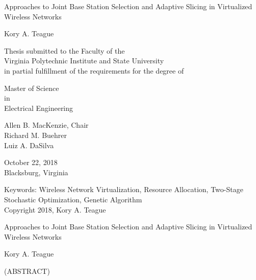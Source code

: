 \documentclass[12pt,dvipsnames]{report}
\begin{document}
\thispagestyle{empty}
\begin{center}

{\Large Approaches to Joint Base Station Selection and Adaptive Slicing in Virtualized Wireless Networks}

\vfill

Kory A. Teague

\vfill

Thesis submitted to the Faculty of the \\
Virginia Polytechnic Institute and State University \\
in partial fulfillment of the requirements for the degree of

\vfill

Master of Science \\
in \\
Electrical Engineering

\vfill

Allen B. MacKenzie, Chair \\
Richard M. Buehrer \\
Luiz A. DaSilva

\vfill

October 22, 2018\\
Blacksburg, Virginia

\vfill

Keywords: Wireless Network Virtualization, Resource Allocation, Two-Stage Stochastic Optimization, Genetic Algorithm \\
Copyright 2018, Kory A. Teague

\end{center}

\pagebreak

\thispagestyle{empty}
\begin{center}

{\large Approaches to Joint Base Station Selection and Adaptive Slicing in Virtualized Wireless Networks}

\vfill

Kory A. Teague

\vfill

(ABSTRACT)

\vfill

\end{center}
\end{document}
